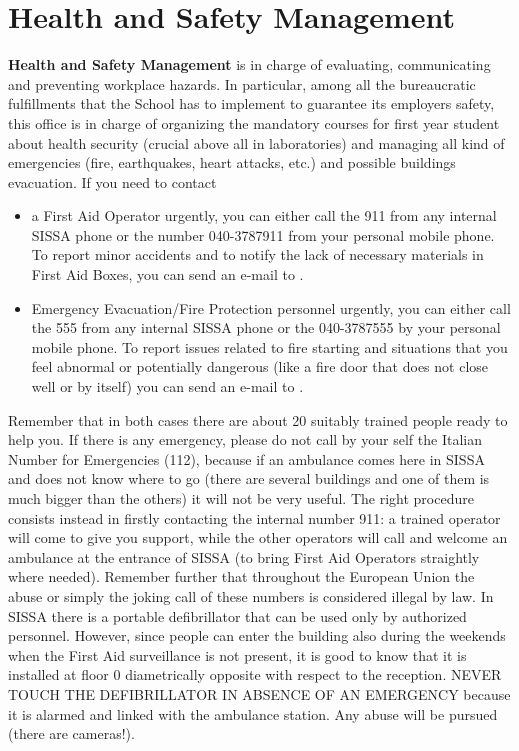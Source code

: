 \documentclass{sissavademecum}
\begin{document}
\section{Health and Safety Management}

\textbf{Health and Safety Management} is in charge of evaluating, communicating and preventing workplace hazards. In particular, among all the bureaucratic fulfillments that the School has to implement to guarantee its employers safety, this office is in charge of organizing the mandatory courses for first year student about health security (crucial above all in laboratories) and managing all kind of emergencies (fire, earthquakes, heart attacks, etc.) and possible buildings evacuation. If you need to contact
\begin{itemize}
	\item  a First Aid Operator urgently, you can either call the \textcolor[rgb]{0.06666667,0.33333334,0.8}{911} from any internal SISSA phone or the number 040-3787911 from your personal mobile phone. To report minor accidents and to notify the lack of necessary materials in First Aid Boxes, you can send an e-mail to . 
	\item Emergency Evacuation/Fire Protection personnel urgently, you can either call the \textcolor[rgb]{0.06666667,0.33333334,0.8}{555} from any internal SISSA phone or the 040-3787555 by your personal mobile phone. To report issues related to fire starting and situations that you feel abnormal or potentially dangerous (like a fire door that does not close well or by itself) you can send an e-mail to . 
\end{itemize}
Remember that in both cases there are about 20 suitably trained people ready to help you. If there is any emergency, please do not call by your self the Italian Number for Emergencies (112), because if an ambulance comes here in SISSA and does not know where to go (there are several buildings and one of them is much bigger than the others) it will not be very useful. The right procedure consists instead in firstly contacting the internal number 911: a trained operator will come to give you support, while the other operators will call and welcome an ambulance at the entrance of SISSA (to bring First Aid Operators straightly where needed). Remember further that throughout the European Union the abuse or simply the joking call of these numbers is considered illegal by law. 
In SISSA there is a portable defibrillator that can be used only by authorized personnel. However, since people can enter the building also during the weekends when the First Aid surveillance is not present, it is good to know that it is installed at floor $0$ diametrically opposite with respect to the reception. NEVER TOUCH THE DEFIBRILLATOR IN ABSENCE OF AN EMERGENCY because it is alarmed and linked with the ambulance station. Any abuse will be pursued (there are cameras!). 
\end{document}
